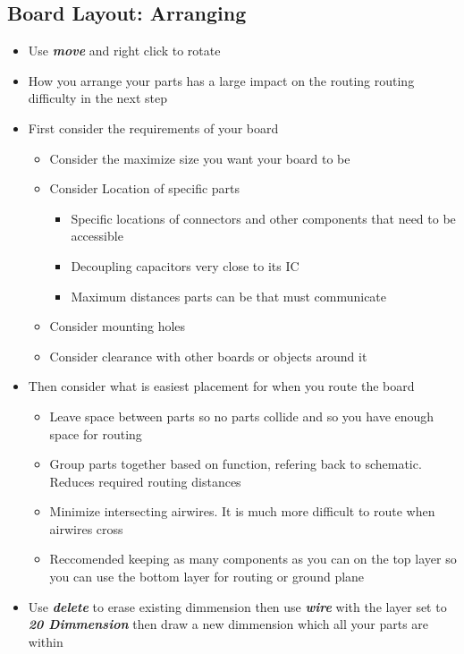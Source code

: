\documentclass{article}
\begin{document}
\subsection{Board Layout: Arranging}
\begin{itemize}
    \item Use \textit{\textbf{move}} and right click to rotate
    \item How you arrange your parts has a large impact on the routing
    routing difficulty in the next step
    \item First consider the requirements of your board
    \begin{itemize}
        \item Consider the maximize size you want your board to be
        \item Consider Location of specific parts
        \begin{itemize}
            \item Specific locations of connectors and other components that
            need to be accessible
            \item Decoupling capacitors very close to its IC
            \item Maximum distances parts can be that must communicate
        \end{itemize}
        \item Consider mounting holes
        \item Consider clearance with other boards or objects around it
    \end{itemize}
    \item Then consider what is easiest placement for when you route the board
    \begin{itemize}
        \item Leave space between parts so no parts collide and so you have
        enough space for routing
        \item Group parts together based on function, refering back to
        schematic. Reduces required routing distances
        \item Minimize intersecting airwires. It is much more difficult to route
        when airwires cross
        \item Reccomended keeping as many components as you can on the top layer
        so you can use the bottom layer for routing or ground plane
    \end{itemize}
    \item Use \textit{\textbf{delete}} to erase existing dimmension then use
    \textit{\textbf{wire}} with the layer set to \textit{\textbf{20 Dimmension}}
    then draw a new dimmension which all your parts are within
\end{itemize}
\end{document}
